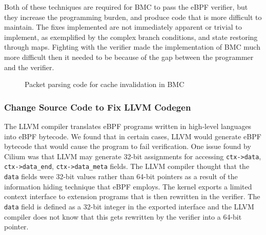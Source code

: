 
Both of these techniques are required for BMC to pass the eBPF verifier, but they
    increase the programming burden, and produce code that is more difficult
    to maintain.
The fixes implemented are not immediately apparent or trivial to implement, as
    exemplified by the complex branch conditions, and state restoring through maps.
Fighting with the verifier made the implementation of BMC much more difficult then
    it needed to be because of the gap between the programmer and the verifier.

\begin{figure}[t]
    
    \caption{Packet parsing code for cache invalidation in BMC}
    \label{fig:bmc-code}
\end{figure}

\subsubsection{Change Source Code to Fix LLVM Codegen}
\label{motivation:llvm-codegen}
The LLVM compiler translates eBPF programs written in high-level languages into eBPF bytecode.
We found that in certain cases, LLVM would generate eBPF bytecode that would cause the program to fail verification.
One issue found by Cilium was that LLVM may generate 32-bit assignments for
    accessing \texttt{ctx->data}, \texttt{ctx->data\_end}, \texttt{ctx->data\_meta} fields.
The LLVM compiler thought that the \texttt{data} fields were 32-bit values rather than 64-bit pointers as 
    a result of the information hiding technique that
    eBPF employs.
The kernel exports a limited context interface to extension programs that is then rewritten in the verifier.
The \texttt{data} field is defined as a 32-bit integer in the exported interface and
    the LLVM compiler does not know that this gets rewritten by the verifier into a 64-bit pointer.

